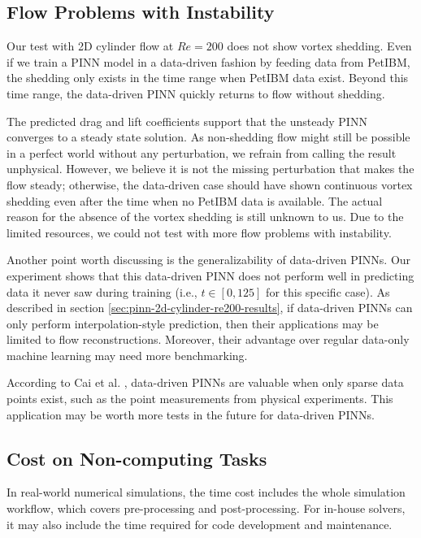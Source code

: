 \subsection*{Flow Problems with Instability}

Our test with 2D cylinder flow at $Re=200$ does not show vortex shedding. 
Even if we train a PINN model in a data-driven fashion by feeding data from PetIBM, the shedding only exists in the time range when PetIBM data exist.
Beyond this time range, the data-driven PINN quickly returns to flow without shedding.

The predicted drag and lift coefficients support that the unsteady PINN converges to a steady state solution.
As non-shedding flow might still be possible in a perfect world without any perturbation, we refrain from calling the result unphysical.
However, we believe it is not the missing perturbation that makes the flow steady; otherwise, the data-driven case should have shown continuous vortex shedding even after the time when no PetIBM data is available.
The actual reason for the absence of the vortex shedding is still unknown to us.
Due to the limited resources, we could not test with more flow problems with instability.

Another point worth discussing is the generalizability of data-driven PINNs.
Our experiment shows that this data-driven PINN does not perform well in predicting data it never saw during training (i.e., $t \in [0, 125]$ for this specific case).
As described in section \ref{sec:pinn-2d-cylinder-re200-results}, if data-driven PINNs can only perform interpolation-style prediction, then their applications may be limited to flow reconstructions.
Moreover, their advantage over regular data-only machine learning may need more benchmarking.

According to Cai et al. \cite{cai_physics-informed_2021}, data-driven PINNs are valuable when only sparse data points exist, such as the point measurements from physical experiments.
This application may be worth more tests in the future for data-driven PINNs.

\subsection*{Cost on Non-computing Tasks}

In real-world numerical simulations, the time cost includes the whole simulation workflow, which covers pre-processing and post-processing.
For in-house solvers, it may also include the time required for code development and maintenance.

